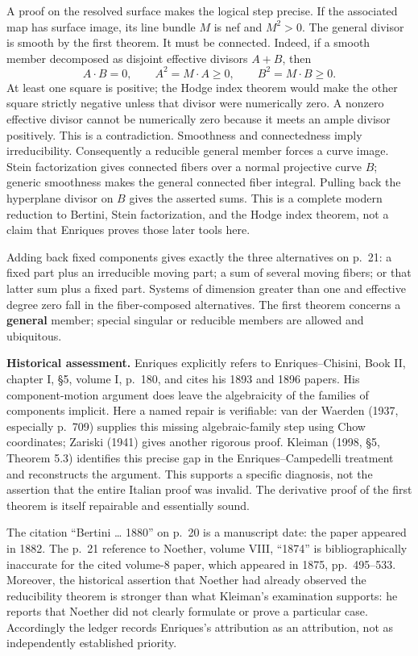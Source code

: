 A proof on the resolved surface makes the logical step precise. If the associated map has surface image, its line bundle \(M\) is nef and \(M^2>0\). The general divisor is smooth by the first theorem. It must be connected. Indeed, if a smooth member decomposed as disjoint effective divisors \(A+B\), then \[
A\cdot B=0,\qquad A^2=M\cdot A\ge0,\qquad
B^2=M\cdot B\ge0.
\] At least one square is positive; the Hodge index theorem would make the other square strictly negative unless that divisor were numerically zero. A nonzero effective divisor cannot be numerically zero because it meets an ample divisor positively. This is a contradiction. Smoothness and connectedness imply irreducibility. Consequently a reducible general member forces a curve image. Stein factorization gives connected fibers over a normal projective curve \(B\); generic smoothness makes the general connected fiber integral. Pulling back the hyperplane divisor on \(B\) gives the asserted sums. This is a complete modern reduction to Bertini, Stein factorization, and the Hodge index theorem, not a claim that Enriques proves those later tools here.

Adding back fixed components gives exactly the three alternatives on p.~21: a fixed part plus an irreducible moving part; a sum of several moving fibers; or that latter sum plus a fixed part. Systems of dimension greater than one and effective degree zero fall in the fiber-composed alternatives. The first theorem concerns a \textbf{general} member; special singular or reducible members are allowed and ubiquitous.

\textbf{Historical assessment.} Enriques explicitly refers to Enriques--Chisini, Book II, chapter I, §5, volume I, p.~180, and cites his 1893 and 1896 papers. His component-motion argument does leave the algebraicity of the families of components implicit. Here a named repair is verifiable: van der Waerden (1937, especially p.~709) supplies this missing algebraic-family step using Chow coordinates; Zariski (1941) gives another rigorous proof. Kleiman (1998, §5, Theorem 5.3) identifies this precise gap in the Enriques--Campedelli treatment and reconstructs the argument. This supports a specific diagnosis, not the assertion that the entire Italian proof was invalid. The derivative proof of the first theorem is itself repairable and essentially sound.

The citation ``Bertini \ldots{} 1880'' on p.~20 is a manuscript date: the paper appeared in 1882. The p.~21 reference to Noether, volume VIII, ``1874'' is bibliographically inaccurate for the cited volume-8 paper, which appeared in 1875, pp.~495--533. Moreover, the historical assertion that Noether had already observed the reducibility theorem is stronger than what Kleiman's examination supports: he reports that Noether did not clearly formulate or prove a particular case. Accordingly the ledger records Enriques's attribution as an attribution, not as independently established priority.

